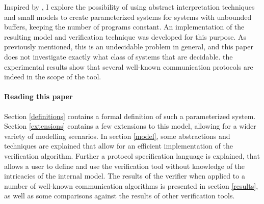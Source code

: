 Inspired by \cite{parosh}, I explore the possibility of using abstract interpretation techniques and small models to create parameterized systems for systems with unbounded buffers, keeping the number of programs constant. An implementation of the resulting model and verification technique was developed for this purpose. As previously mentioned, this is an undecidable problem in general, and this paper does not investigate exactly what class of systems that are decidable. the experimental results show that several well-known communication protocols are indeed in the scope of the tool.

\paragraph{Reading this paper} Section \ref{definitions} contains a formal definition of such a parameterized system. Section \ref{extensions} contains a few extensions to this model, allowing for a wider variety of modelling scenarios. In section \ref{model}, some abstractions and techniques are explained that allow for an efficient implementation of the verification algorithm. Further a protocol specification language is explained, that allows a user to define and use the verification tool without knowledge of the intricacies of the internal model. The results of the verifier when applied to a number of well-known communication algorithms is presented in section \ref{results}, as well as some comparisons against the results of other verification tools.

